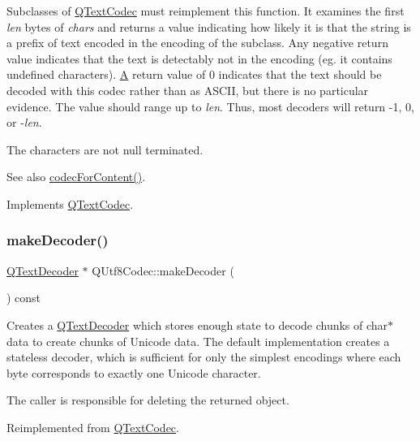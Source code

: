 Subclasses of \mbox{\hyperlink{class_q_text_codec}{Q\+Text\+Codec}} must reimplement this function. It examines the first {\itshape len} bytes of {\itshape chars} and returns a value indicating how likely it is that the string is a prefix of text encoded in the encoding of the subclass. Any negative return value indicates that the text is detectably not in the encoding (eg. it contains undefined characters). \mbox{\hyperlink{class_a}{A}} return value of 0 indicates that the text should be decoded with this codec rather than as A\+S\+C\+II, but there is no particular evidence. The value should range up to {\itshape len}. Thus, most decoders will return -\/1, 0, or -\/{\itshape len}.

The characters are not null terminated.

\begin{DoxySeeAlso}{See also}
\mbox{\hyperlink{class_q_text_codec_aeb3ec365c6c4f1812689a2b66ed09e27}{codec\+For\+Content()}}. 
\end{DoxySeeAlso}


Implements \mbox{\hyperlink{class_q_text_codec_a4780a608d950994a927de727bb07b9fe}{Q\+Text\+Codec}}.

\mbox{\label{class_q_utf8_codec_a0e08549580abc7270123937115f746c8}} 
\subsubsection{\texorpdfstring{makeDecoder()}{makeDecoder()}}
{\footnotesize\ttfamily \mbox{\hyperlink{class_q_text_decoder}{Q\+Text\+Decoder}} $\ast$ Q\+Utf8\+Codec\+::make\+Decoder (\begin{DoxyParamCaption}{ }\end{DoxyParamCaption}) const\hspace{0.3cm}{\ttfamily [virtual]}}

Creates a \mbox{\hyperlink{class_q_text_decoder}{Q\+Text\+Decoder}} which stores enough state to decode chunks of char$\ast$ data to create chunks of Unicode data. The default implementation creates a stateless decoder, which is sufficient for only the simplest encodings where each byte corresponds to exactly one Unicode character.

The caller is responsible for deleting the returned object. 

Reimplemented from \mbox{\hyperlink{class_q_text_codec_abb65882aa316a2ad49a10e9f86c4dc88}{Q\+Text\+Codec}}.

